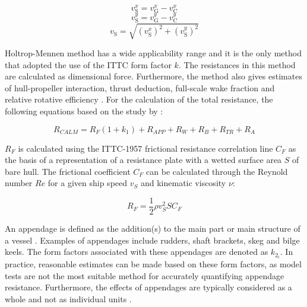\documentclass[]{interact}
\theoremstyle{plain}%
\theoremstyle{definition}
\theoremstyle{remark}
\begin{document}
\begin{equation}\label{eqn:stwx}
  v_{\text{S}}^x = v_{\text{G}}^x - v_{\text{C}}^x    
\end{equation}
\begin{equation}\label{eqn:stwy}
  v_{\text{S}}^y = v_{\text{G}}^y - v_{\text{C}}^y      
\end{equation}
\begin{equation}\label{eqn:stwabs}
  v_{\text{S}} = \sqrt{(v_{\text{S}}^x)^2 + (v_{\text{S}}^y)^2} 
\end{equation}

Holtrop-Mennen method has a wide applicability range and it is the only method that adopted the use of the ITTC form factor $k$. The resistances in this method are calculated as dimensional force. Furthermore, the method also gives estimates of hull-propeller interaction, thrust deduction, full-scale wake fraction and relative rotative efficiency \citep{Birk.2019}. For the calculation of the total resistance, the following equations based on the study by \citet{Holtrop.1978,Holtrop.1982,Holtrop.1984}:

\begin{equation}\label{eqn:R_calm}
  R_{CALM} = R_F(1+k_1) + R_{APP} + R_W + R_B + R_{TR} + R_A
\end{equation}

\textbf{$R_F$} is calculated using the ITTC-1957 frictional resistance correlation line $C_F$ as the basis of a representation of a resistance plate with a wetted surface area $S$ of bare hull. The frictional coefficient $C_F$ can be calculated through the Reynold number $Re$ for a given ship speed $v_{S}$ and kinematic viscosity $\nu$: 

\begin{equation}\label{eqn:R_f}
  R_F = \frac{1}{2}\rho v_{S}^2 S C_F 
\end{equation}

An appendage is defined as the addition(s) to the main part or main structure of a vessel \citep{Molland.2011}. Examples of appendages include rudders, shaft brackets, skeg and bilge keels. The form factors associated with these appendages are denoted as $k_{2_i}$. In practice, reasonable estimates can be made based on these form factors, as model tests are not the most suitable method for accurately quantifying appendage resistance. Furthermore, the effects of appendages are typically considered as a whole and not as individual units \citep{Birk.2019}.\\
\end{document}
